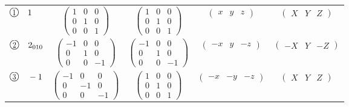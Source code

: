 \documentclass[fleqn,10pt,landscape]{jsarticle}
\begin{document}
\begin{center}
\begin{longtable}{lcccc}
$ {\ooalign{\hfil\resizebox{.8\width}{\height}{1}\hfil\crcr\raise.1ex\hbox{\large$\bigcirc$}}}\quad 1 $ & $ \begin{pmatrix} 1 & 0 & 0 \\ 0 & 1 & 0 \\ 0 & 0 & 1 \end{pmatrix} $ & $ \begin{pmatrix} 1 & 0 & 0 \\ 0 & 1 & 0 \\ 0 & 0 & 1 \end{pmatrix} $ & $ \begin{pmatrix} x & y & z \end{pmatrix} $ & $ \begin{pmatrix} X & Y & Z \end{pmatrix} $ \\
$ {\ooalign{\hfil\resizebox{.8\width}{\height}{2}\hfil\crcr\raise.1ex\hbox{\large$\bigcirc$}}}\quad 2{}_{010} $ & $ \begin{pmatrix} -1 & 0 & 0 \\ 0 & 1 & 0 \\ 0 & 0 & -1 \end{pmatrix} $ & $ \begin{pmatrix} -1 & 0 & 0 \\ 0 & 1 & 0 \\ 0 & 0 & -1 \end{pmatrix} $ & $ \begin{pmatrix} - x & y & - z \end{pmatrix} $ & $ \begin{pmatrix} - X & Y & - Z \end{pmatrix} $ \\
$ {\ooalign{\hfil\resizebox{.8\width}{\height}{3}\hfil\crcr\raise.1ex\hbox{\large$\bigcirc$}}}\quad -1 $ & $ \begin{pmatrix} -1 & 0 & 0 \\ 0 & -1 & 0 \\ 0 & 0 & -1 \end{pmatrix} $ & $ \begin{pmatrix} 1 & 0 & 0 \\ 0 & 1 & 0 \\ 0 & 0 & 1 \end{pmatrix} $ & $ \begin{pmatrix} - x & - y & - z \end{pmatrix} $ & $ \begin{pmatrix} X & Y & Z \end{pmatrix} $ \\

\end{longtable}
\end{center}
\end{document}
